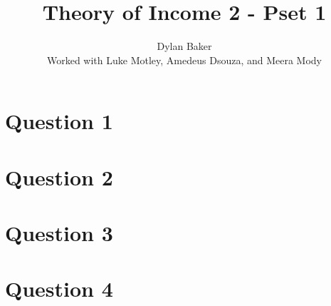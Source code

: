 \documentclass[10pt]{article}
\title{Theory of Income 2 - Pset 1}
\author{Dylan Baker \\
Worked with Luke Motley, Amedeus Dsouza, and Meera Mody}
\date{}
\begin{document}
\maketitle

\tableofcontents

\section{Question 1}


\pagebreak

\section{Question 2}


\pagebreak

\section{Question 3}


\pagebreak

\section{Question 4}

\end{document}
